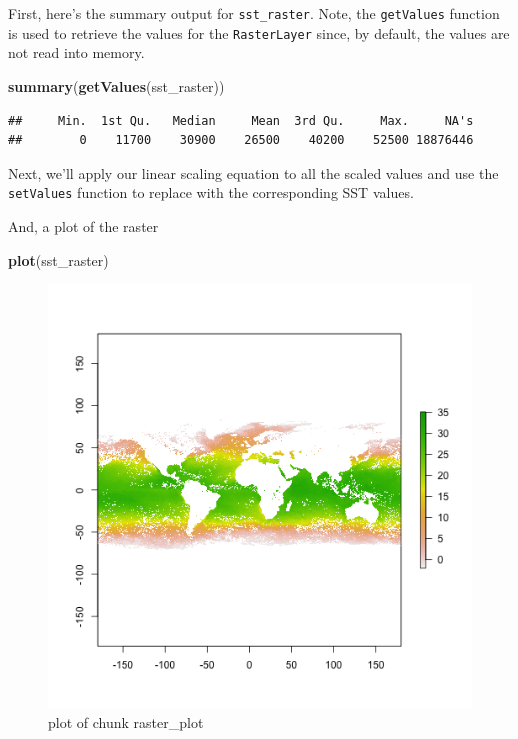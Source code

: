 \documentclass[]{article}
\makeatletter
\newenvironment{Shaded}{}{}
\newcommand{\KeywordTok}[1]{\textcolor[rgb]{0.00,0.44,0.13}{\textbf{{#1}}}}
\newcommand{\NormalTok}[1]{{#1}}
\def\maxwidth{\ifdim\Gin@nat@width>\linewidth\linewidth
\else\Gin@nat@width\fi}
\let\Oldincludegraphics\includegraphics
\renewcommand{\includegraphics}[1]{\Oldincludegraphics[width=\maxwidth]{#1}}
\makeatother
\begin{document}
First, here's the summary output for \texttt{sst\_raster}. Note, the
\texttt{getValues} function is used to retrieve the values for the
\texttt{RasterLayer} since, by default, the values are not read into
memory.

\begin{Shaded}
\begin{Highlighting}[]
\KeywordTok{summary}\NormalTok{(}\KeywordTok{getValues}\NormalTok{(sst_raster))}
\end{Highlighting}
\end{Shaded}
\begin{verbatim}
##     Min.  1st Qu.   Median     Mean  3rd Qu.     Max.     NA's 
##        0    11700    30900    26500    40200    52500 18876446 
\end{verbatim}

Next, we'll apply our linear scaling equation to all the scaled values
and use the \texttt{setValues} function to replace with the
corresponding SST values.

\begin{Shaded}
\end{Shaded}
And, a plot of the raster

\begin{Shaded}
\begin{Highlighting}[]
\KeywordTok{plot}\NormalTok{(sst_raster)}
\end{Highlighting}
\end{Shaded}
\begin{figure}[htbp]
\centering
\includegraphics{figure/raster_plot.png}
\caption{plot of chunk raster\_plot}
\end{figure}
\end{document}
